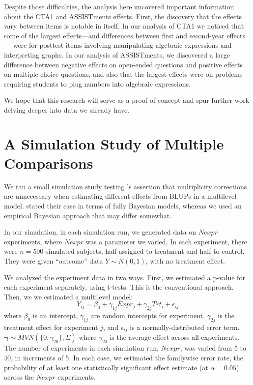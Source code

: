 \documentclass{edm_article}
\begin{document}
Despite those difficulties, the analysis here uncovered important
information about the CTA1 and ASSISTments effects.
First, the discovery that the effects vary between items is notable in
itself. 
In our analysis of CTA1 we noticed that some of the largest
effects---and differences between first and second-year effects---
were for posttest items involving manipulating algebraic expressions
and interpreting graphs.
In our analysis of ASSISTments, we discovered a large difference
between negative effects on open-ended questions and positive effects
on multiple choice questions, and also that the largest effects were
on problems requiring students to plug numbers into algebraic
expressions.

We hope that this research will serve as a proof-of-concept and spur
further work delving deeper into data we already have.



\appendix

\section{A Simulation Study of Multiple Comparisons}
We ran a small simulation study testing \cite{gelman2012we}'s
assertion that multiplicity corrections are unnecessary when
estimating different effects from BLUPs in a multilevel model.
\cite{gelman2012we} stated their case in terms of fully Bayesian
models, whereas we used an empirical Bayesian approach that may differ
somewhat.

In our simulation, in each simulation run, we generated data on
$Nexpr$ experiments, where $Nexpr$ was a parameter we varied.
In each experiment, there were $n=500$ simulated subjects, half assigned to
treatment and half to control. They were given ``outcome'' data $Y\sim
N(0,1)$, with no treatment effect.

We analyzed the experiment data in two ways. First, we estimated a
p-value for each experiment separately, using t-tests. This is the
conventional approach. Then, we we estimated a multilevel model:
\begin{equation*}
  Y_{ij}=\beta_0+\gamma_{1j}Expr_j+\gamma_{2j}Trt_i+\epsilon_{ij}
\end{equation*}
where $\beta_0$ is an intercept, $\gamma_{1j}$ are random intercepts
for experiment, $\gamma_{2j}$ is the treatment effect for experiment
$j$, and $\epsilon_{ij}$ is a normally-distributed error term.
$\bm{\gamma}\sim MVN\left(\{0,\gamma_{20}\},\Sigma\right)$ where
$\gamma_{20}$ is the average effect across all experiments.
The number of experiments in each simulation run, $Nexpr$, was varied from 5 to
40, in increments of 5.
In each case, we estimated the familywise error rate, the probability
of at least one statistically significant effect estimate (at
$\alpha=0.05$) across the
$Nexpr$ experiments.
\end{document}
